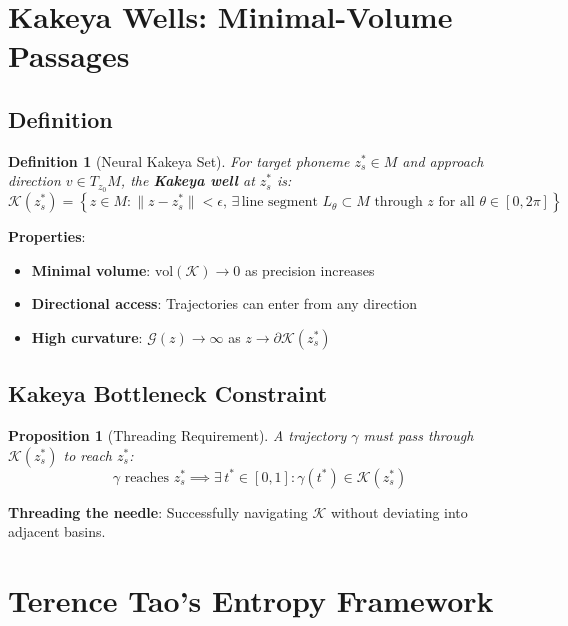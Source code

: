 \documentclass[12pt]{article}
\newtheorem{proposition}{Proposition}
\newtheorem{definition}{Definition}
\begin{document}
\section{Kakeya Wells: Minimal-Volume Passages}

\subsection{Definition}

\begin{definition}[Neural Kakeya Set]
For target phoneme $z_s^* \in M$ and approach direction $v \in T_{z_0}M$, the \textbf{Kakeya well} at $z_s^*$ is:
\begin{equation}
\mathcal{K}(z_s^*) = \left\{z \in M : \|z - z_s^*\| < \epsilon, \, \exists \, \text{line segment } L_\theta \subset M \text{ through } z \text{ for all } \theta \in [0, 2\pi] \right\}
\end{equation}
\end{definition}

\textbf{Properties}:
\begin{itemize}
\item \textbf{Minimal volume}: $\text{vol}(\mathcal{K}) \to 0$ as precision increases
\item \textbf{Directional access}: Trajectories can enter from any direction
\item \textbf{High curvature}: $\mathcal{G}(z) \to \infty$ as $z \to \partial \mathcal{K}(z_s^*)$
\end{itemize}

\subsection{Kakeya Bottleneck Constraint}

\begin{proposition}[Threading Requirement]
A trajectory $\gamma$ must pass through $\mathcal{K}(z_s^*)$ to reach $z_s^*$:
\begin{equation}
\gamma \text{ reaches } z_s^* \implies \exists \, t^* \in [0,1] : \gamma(t^*) \in \mathcal{K}(z_s^*)
\end{equation}
\end{proposition}

\textbf{Threading the needle}: Successfully navigating $\mathcal{K}$ without deviating into adjacent basins.

\section{Terence Tao's Entropy Framework}
\end{document}
